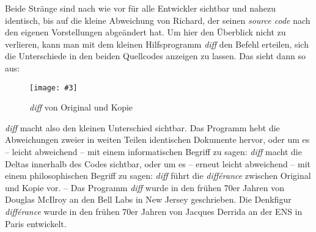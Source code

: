 \documentclass[a4paper,12pt]{article}
\newcommand{\pngbild}[4]{\texttt{[image: \#3]}}
\begin{document}
Beide Stränge sind nach wie vor für alle Entwickler sichtbar und nahezu identisch, bis auf die kleine Abweichung von {\color{dzug}Richard}, der seinen \emph{source code} nach den eigenen Vorstellungen abgeändert hat. Um hier den Überblick nicht zu verlieren, kann man mit dem kleinen Hilfsprogramm \emph{diff} den Befehl erteilen, sich die Unterschiede in den beiden Quellcodes anzeigen zu lassen. Das sieht dann so aus: 


\begin{figure}[ht]
\begin{center}
\pngbild{568}{421}{../bilder/OriginalKopie.png}{1.1\textwidth}\\[-3mm]
\caption{\emph{diff} von Original und Kopie}\label{abb:orikopie}
\end{center}
\end{figure}

\emph{diff} macht also den kleinen Unterschied sichtbar. Das Programm hebt die Abweichungen zweier in weiten Teilen identischen Dokumente hervor, oder um es – leicht abweichend – mit einem informatischen Begriff zu sagen: \emph{diff} macht die Deltas innerhalb des Codes sichtbar, oder um es – erneut leicht abweichend – mit einem philosophischen Begriff zu sagen: \emph{diff} führt die \emph{différance} zwischen Original und Kopie vor. – Das Programm \emph{diff} wurde in den frühen 70er Jahren von Douglas McIlroy an den Bell Labs in New Jersey geschrieben. Die Denkfigur \emph{différance} wurde in den frühen 70er Jahren von Jacques Derrida an der ENS in Paris entwickelt. 
\end{document}
